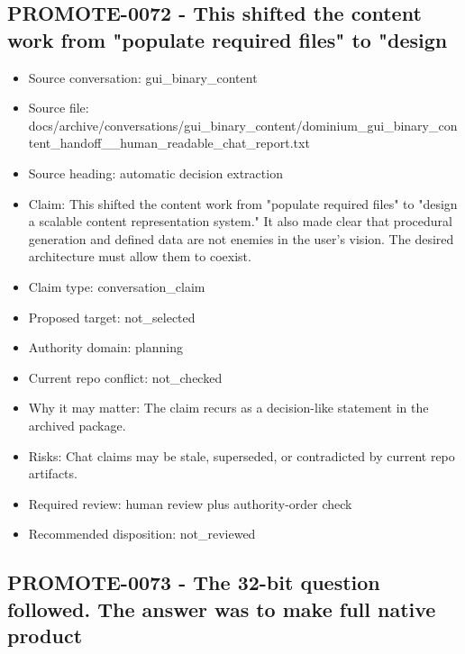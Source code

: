 \documentclass[11pt,a4paper]{report}
\begin{document}
\subsection{PROMOTE-0072 - This shifted the content work from "populate required files" to "design}

\begin{itemize}
\item Source conversation: gui\_binary\_content
\item Source file: docs/archive/conversations/gui\_binary\_content/dominium\_gui\_binary\_content\_handoff\_\_human\_readable\_chat\_report.txt
\item Source heading: automatic decision extraction
\item Claim: This shifted the content work from "populate required files" to "design a scalable content representation system." It also made clear that procedural generation and defined data are not enemies in the user's vision. The desired architecture must allow them to coexist.
\item Claim type: conversation\_claim
\item Proposed target: not\_selected
\item Authority domain: planning
\item Current repo conflict: not\_checked
\item Why it may matter: The claim recurs as a decision-like statement in the archived package.
\item Risks: Chat claims may be stale, superseded, or contradicted by current repo artifacts.
\item Required review: human review plus authority-order check
\item Recommended disposition: not\_reviewed
\end{itemize}

\subsection{PROMOTE-0073 - The 32-bit question followed. The answer was to make full native product}
\end{document}
